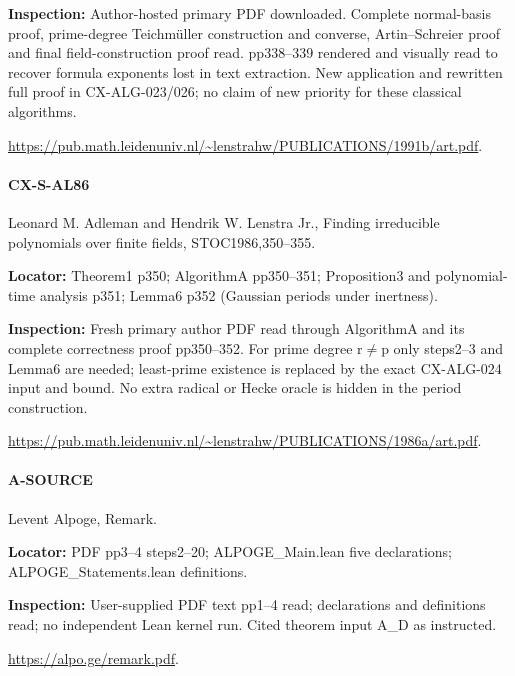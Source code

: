 \documentclass[11pt,a4paper]{article}
\begin{document}
\textbf{Inspection:} Author-hosted primary PDF downloaded.\allowbreak{} Complete normal-basis proof, prime-degree Teichmüller construction and converse, Artin–\allowbreak{}Schreier proof and final field-construction proof read.\allowbreak{} pp338–\allowbreak{}339 rendered and visually read to recover formula exponents lost in text extraction.\allowbreak{} New application and rewritten full proof in CX-ALG-023/\allowbreak{}026; no claim of new priority for these classical algorithms.\allowbreak{}

\url{https://pub.math.leidenuniv.nl/~lenstrahw/PUBLICATIONS/1991b/art.pdf}.

\paragraph{CX-S-AL86} Leonard M.\allowbreak{} Adleman and Hendrik W.\allowbreak{} Lenstra Jr.\allowbreak{}, Finding irreducible polynomials over finite fields, STOC1986,350–\allowbreak{}355.

\textbf{Locator:} Theorem1 p350; AlgorithmA pp350–\allowbreak{}351; Proposition3 and polynomial-time analysis p351; Lemma6 p352 (Gaussian periods under inertness).

\textbf{Inspection:} Fresh primary author PDF read through AlgorithmA and its complete correctness proof pp350–\allowbreak{}352.\allowbreak{} For prime degree r\ensuremath{\ne}p only steps2–\allowbreak{}3 and Lemma6 are needed; least-prime existence is replaced by the exact CX-ALG-024 input and bound.\allowbreak{} No extra radical or Hecke oracle is hidden in the period construction.\allowbreak{}

\url{https://pub.math.leidenuniv.nl/~lenstrahw/PUBLICATIONS/1986a/art.pdf}.

\paragraph{A-SOURCE} Levent Alpoge, Remark.

\textbf{Locator:} PDF pp3–\allowbreak{}4 steps2–\allowbreak{}20; ALPOGE\_\allowbreak{}Main.\allowbreak{}lean five declarations; ALPOGE\_\allowbreak{}Statements.\allowbreak{}lean definitions.

\textbf{Inspection:} User-supplied PDF text pp1–\allowbreak{}4 read; declarations and definitions read; no independent Lean kernel run.\allowbreak{} Cited theorem input A\_\allowbreak{}D as instructed.\allowbreak{}

\url{https://alpo.ge/remark.pdf}.
\end{document}

